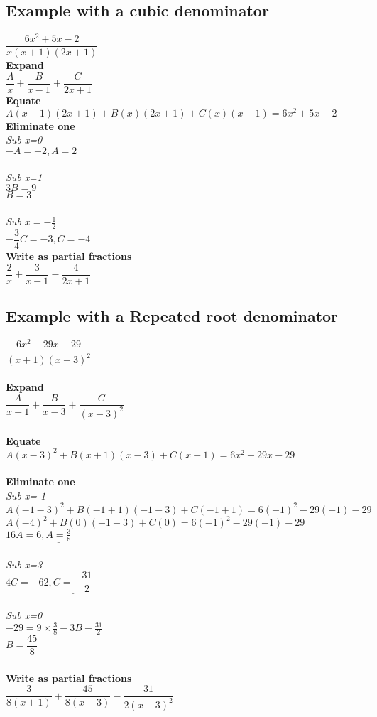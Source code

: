 \documentclass{article}[18pt]
\begin{document}
\subsection{Example with a cubic denominator}
$\dfrac{6x^2+5x-2}{x(x+1)(2x+1)}$\\
\textbf{Expand}\\
$\dfrac{A}{x}+\dfrac{B}{x-1}+\dfrac{C}{2x+1}$\\
\textbf{Equate}\\
$A(x-1)(2x+1)+B(x)(2x+1)+C(x)(x-1)=6x^2+5x-2$\\
\textbf{Eliminate one}\\
\textit{Sub x=0}\\
$-A=-2, \underline{A=2}$\\
\\
\textit{Sub x=1}\\
$3B=9$\\
$\underline{B=3}$\\
\\
\textit{Sub $x=-\frac{1}{2}$}\\
$-\dfrac{3}{4}C=-3, \underline{C=-4}$\\
\textbf{Write as partial fractions}\\
$\dfrac{2}{x}+\dfrac{3}{x-1}-\dfrac{4}{2x+1}$
\subsection{Example with a Repeated root denominator}
$\dfrac{6x^2-29x-29}{(x+1)(x-3)^2}$\\
\\
\textbf{Expand}\\
$\dfrac{A}{x+1}+\dfrac{B}{x-3}+\dfrac{C}{(x-3)^2}$\\
\\
\textbf{Equate}\\
$A(x-3)^2+B(x+1)(x-3)+C(x+1)=6x^2-29x-29$\\
\\
\textbf{Eliminate one}\\
\textit{Sub x=-1}\\
$A(-1-3)^2+B(-1+1)(-1-3)+C(-1+1)=6(-1)^2-29(-1)-29$\\
$A(-4)^2+B(0)(-1-3)+C(0)=6(-1)^2-29(-1)-29$\\
$16A=6, \underline{A=\frac{3}{8}}$\\
\\
\textit{Sub x=3}\\
$4C=-62, \underline{C=-\dfrac{31}{2}}$\\
\\
\textit{Sub x=0}\\
$-29=9\times\frac{3}{8}-3B-\frac{31}{2}$\\
$\underline{B=\dfrac{45}{8}}$\\
\\
\textbf{Write as partial fractions}\\
$\dfrac{3}{8(x+1)}+\dfrac{45}{8(x-3)}-\dfrac{31}{2(x-3)^2}$
\end{document}
